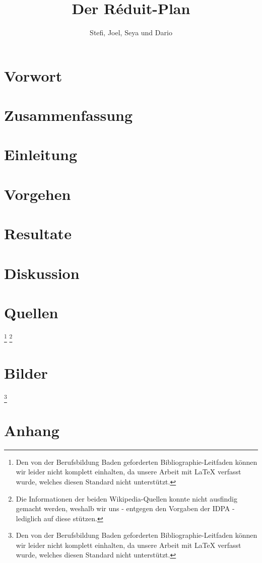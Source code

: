 \documentclass[opensans, a4paper]{article}
\title{Der Réduit-Plan}
\author{Stefi, Joel, Seya und Dario}
\begin{document}


\pagestyle{empty}
\tableofcontents
\clearpage
\pagestyle{plain}

\newpage

\section{Vorwort} \label{Vorwort}

\newpage 

\section{Zusammenfassung} \label{Zusammenfassung}

\newpage

\section{Einleitung} \label{Einleitung}

\newpage

\section{Vorgehen} \label{Vorgehen}

\newpage

\section{Resultate} \label{Resultate}

\newpage

\section{Diskussion} \label{Diskussion}

\newpage

\section{Quellen} \label{Quellen}
{ 
\footnote{Den von der Berufsbildung Baden geforderten Bibliographie-Leitfaden können wir leider nicht komplett einhalten, da unsere Arbeit mit LaTeX verfasst wurde, welches diesen Standard nicht unterstützt.}
\footnote{Die Informationen der beiden Wikipedia-Quellen konnte nicht ausfindig gemacht werden, weshalb wir uns - entgegen den Vorgaben der IDPA - lediglich auf diese stützen.}
\printbibliography 
}
\newpage

\section{Bilder} \label{Bilder}
\footnote{Den von der Berufsbildung Baden geforderten Bibliographie-Leitfaden können wir leider nicht komplett einhalten, da unsere Arbeit mit LaTeX verfasst wurde, welches diesen Standard nicht unterstützt.}
\listoffigures
\newpage

\section{Anhang} \label{Anhang}

\end{document}
